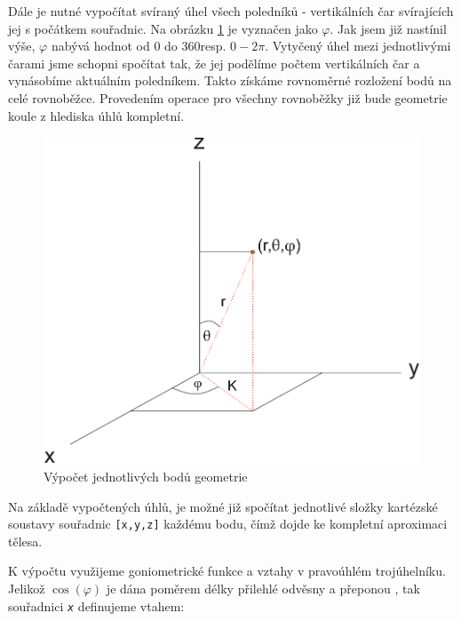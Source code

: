 Dále je nutné vypočítat svíraný úhel všech poledníků - vertikálních čar svírajících jej s počátkem souřadnic. Na obrázku \ref{fig:geom} je vyznačen jako $\varphi$. Jak jsem již nastínil výše, $\varphi$ nabývá hodnot od 0 do 360\degree resp. $0-2\pi$. Vytyčený úhel mezi jednotlivými čarami jsme schopni spočítat tak, že jej podělíme počtem vertikálních čar a vynásobíme aktuálním poledníkem. Takto získáme rovnoměrné rozložení bodů na celé rovnoběžce. Provedením  operace pro všechny rovnoběžky již bude geometrie koule z hlediska úhlů kompletní.

\begin{figure}[h]
	\label{img:2}
	\centering
	\includegraphics[scale=1.0,angle=0,width=0.8\linewidth]{obrazky-figures/geometry}
	\caption{Výpočet jednotlivých bodů geometrie}
	\label{fig:geom}
\end{figure}
 
Na základě vypočtených úhlů, je možné již spočítat jednotlivé složky kartézské soustavy souřadnic \texttt{[x,y,z]} každému bodu, čímž dojde ke kompletní aproximaci tělesa.

\newpage

K výpočtu využijeme goniometrické funkce  a vztahy v pravoúhlém trojúhelníku. Jelikož $ \cos (\varphi) $ je dána poměrem délky přilehlé odvěsny a přeponou \cite{Goniometrie}, tak souřadnici \texttt{\textit{x}} definujeme vtahem:
 
